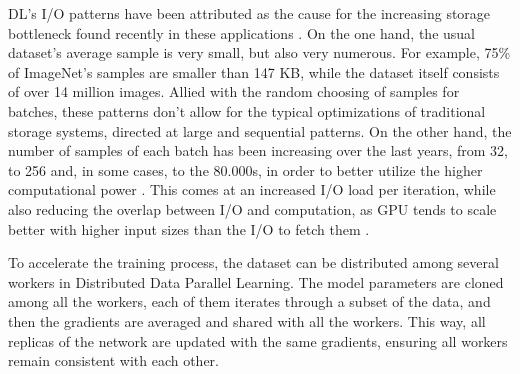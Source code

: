 \documentclass[conference]{IEEEtran}
\begin{document}
    DL's I/O patterns have been attributed as the cause for the increasing storage bottleneck found recently in these applications \cite{beegfs}. On the one hand, the usual dataset's average sample is very small, but also very numerous. For example, 75\% of ImageNet's samples are smaller than 147 KB, while the dataset itself consists of over 14 million images. Allied with the random choosing of samples for batches, these patterns don't allow for the typical optimizations of traditional storage systems, directed at large and sequential patterns. On the other hand, the number of samples of each batch has been increasing over the last years, from 32, to 256 and, in some cases, to the 80.000s, in order to better utilize the higher computational power \cite{nvme}. This comes at an increased I/O load per iteration, while also reducing the overlap between I/O and computation, as GPU tends to scale better with higher input sizes than the I/O to fetch them \cite{TFbenchmark}.
    

    To accelerate the training process, the dataset can be distributed among several workers in Distributed Data Parallel Learning. The model parameters are cloned among all the workers, each of them iterates through a subset of the data, and then the gradients are averaged and shared with all the workers. This way, all replicas of the network are updated with the same gradients, ensuring all workers remain consistent with each other.
\end{document}
